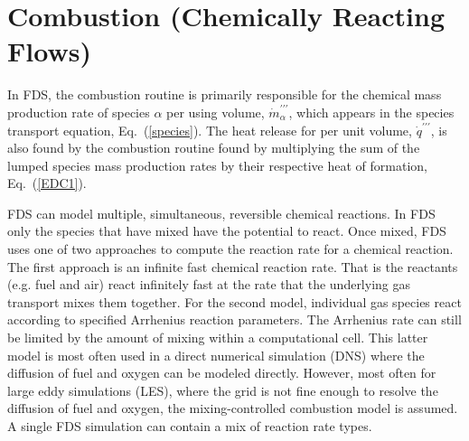 \chapter{Combustion (Chemically Reacting Flows)}

\label{combustionsection}
In FDS, the combustion routine is primarily responsible for the chemical mass production rate of species $\alpha$ per using volume, $\dot{m}^{\prime\prime\prime}_{\alpha}$, which appears in the species transport equation, Eq.~(\ref{species}). The heat release for per unit volume, $\dot{q}^{\prime\prime\prime}$, is also found by the combustion routine found by multiplying the sum of the lumped species mass production rates by their respective heat of formation, Eq.~(\ref{EDC1}).

FDS can model multiple, simultaneous, reversible chemical reactions.  In FDS only the species that have mixed have the potential to react. Once mixed, FDS uses one of two approaches to compute the reaction rate for a chemical reaction.  The first approach is an infinite fast chemical reaction rate. That is the reactants (e.g. fuel and air) react infinitely fast at the rate that the underlying gas transport mixes them together.  For the second model, individual gas species react according to specified Arrhenius reaction parameters. The Arrhenius rate can still be limited by the amount of mixing within a computational cell. This latter model is most often used in a direct numerical simulation (DNS) where the diffusion of fuel and oxygen can be modeled directly. However, most often for large eddy simulations (LES), where the grid is not fine enough to resolve the diffusion of fuel and oxygen,
the mixing-controlled combustion model is assumed. A single FDS simulation can contain a mix of reaction rate types.

